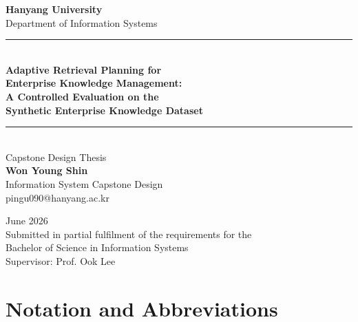 \documentclass[12pt, a4paper, twoside]{report}
\begin{document}
\begin{titlepage}
\centering
\vspace*{2cm}

{\Large\textbf{Hanyang University}}\\[0.5em]
{\large Department of Information Systems}\\[3em]

\rule{\textwidth}{1.5pt}\\[0.5em]
{\huge\bfseries Adaptive Retrieval Planning for\\[0.3em]
Enterprise Knowledge Management:\\[0.3em]
A Controlled Evaluation on the\\[0.3em]
Synthetic Enterprise Knowledge Dataset}\\[0.5em]
\rule{\textwidth}{1.5pt}\\[3em]

{\large Capstone Design Thesis}\\[2em]

{\large\bfseries Won Young Shin}\\[0.3em]
{\large Information System Capstone Design}\\[1em]
{\large pingu090@hanyang.ac.kr}\\[4em]

\vfill

{\large June 2026}\\[1em]

{\normalsize
Submitted in partial fulfilment of the requirements for the\\
Bachelor of Science in Information Systems\\[1em]
Supervisor: Prof. Ook Lee
}

\end{titlepage}




\clearpage
\tableofcontents

\clearpage
\listoffigures
{}

\clearpage
\listoftables
{}

\clearpage
\chapter*{Notation and Abbreviations}
\end{document}
